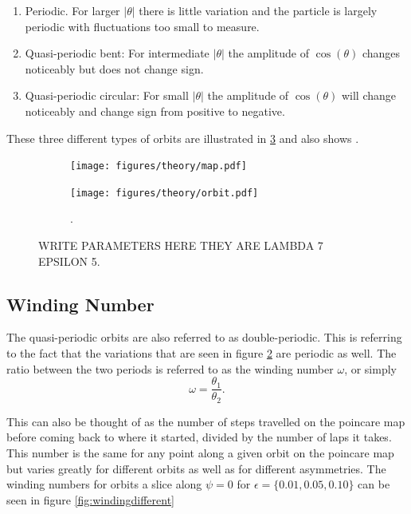 \begin{enumerate}
\item Periodic. For larger $\left|\theta\right|$ there is little variation and the particle is largely periodic with fluctuations too small to measure.
\item Quasi-periodic bent: For intermediate $\left|\theta\right|$ the amplitude of $\cos(\theta)$ changes noticeably but does not change sign.
\item Quasi-periodic circular: For small $\left|\theta\right|$ the amplitude of $\cos(\theta)$ will change noticeably and change sign from positive to negative.
\end{enumerate}

These three different types of orbits are illustrated in \ref{fig:orbittypes} and also shows .

\begin{figure}[H]
\centering
\begin{subfigure}[3a]{0.40\textwidth}
\texttt{[image: figures/theory/map.pdf]}
\caption{}\label{fig:orbitmap}
\end{subfigure}\hspace{1em}%
\begin{subfigure}[3b]{0.40\textwidth}
\texttt{[image: figures/theory/orbit.pdf]}
\caption{.}\label{fig:orbitparams}
\end{subfigure}
\caption{WRITE PARAMETERS HERE THEY ARE LAMBDA 7 EPSILON 5.}
\label{fig:orbittypes}
\end{figure}

\subsection{Winding Number}
The quasi-periodic orbits are also referred to as double-periodic. This is referring to the fact that the variations that are seen in figure \ref{fig:orbitparams} are periodic as well. The ratio between the two periods is referred to as the winding number $\omega$, or simply
\begin{equation}\label{eq:winding}
\omega = \frac{\theta_1}{\theta_2}.
\end{equation}

This can also be thought of as the number of steps travelled on the poincare map before coming back to where it 
started, divided by the number of laps it takes. This number is the same for any point along a given orbit on the 
poincare map but varies greatly for different orbits as well as for different asymmetries. The winding numbers for
 orbits a slice along $\psi=0$ for $\epsilon=\{0.01, 0.05, 0.10\}$ can be seen in figure \ref{fig:windingdifferent}
 
